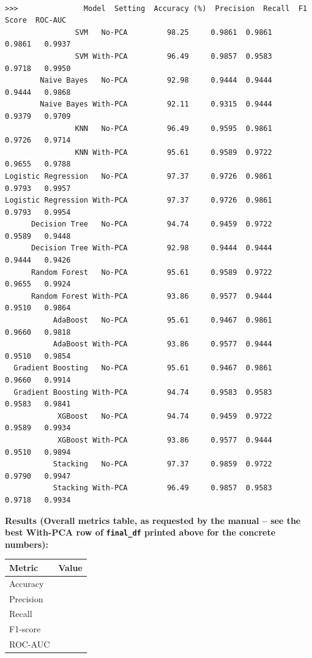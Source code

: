 \documentclass[12pt,a4paper]{article}
\begin{document}
\begin{verbatim}

>>>               Model  Setting  Accuracy (%)  Precision  Recall  F1 Score  ROC-AUC
                SVM   No-PCA         98.25     0.9861  0.9861    0.9861   0.9937
                SVM With-PCA         96.49     0.9857  0.9583    0.9718   0.9950
        Naive Bayes   No-PCA         92.98     0.9444  0.9444    0.9444   0.9868
        Naive Bayes With-PCA         92.11     0.9315  0.9444    0.9379   0.9709
                KNN   No-PCA         96.49     0.9595  0.9861    0.9726   0.9714
                KNN With-PCA         95.61     0.9589  0.9722    0.9655   0.9788
Logistic Regression   No-PCA         97.37     0.9726  0.9861    0.9793   0.9957
Logistic Regression With-PCA         97.37     0.9726  0.9861    0.9793   0.9954
      Decision Tree   No-PCA         94.74     0.9459  0.9722    0.9589   0.9448
      Decision Tree With-PCA         92.98     0.9444  0.9444    0.9444   0.9426
      Random Forest   No-PCA         95.61     0.9589  0.9722    0.9655   0.9924
      Random Forest With-PCA         93.86     0.9577  0.9444    0.9510   0.9864
           AdaBoost   No-PCA         95.61     0.9467  0.9861    0.9660   0.9818
           AdaBoost With-PCA         93.86     0.9577  0.9444    0.9510   0.9854
  Gradient Boosting   No-PCA         95.61     0.9467  0.9861    0.9660   0.9914
  Gradient Boosting With-PCA         94.74     0.9583  0.9583    0.9583   0.9841
            XGBoost   No-PCA         94.74     0.9459  0.9722    0.9589   0.9934
            XGBoost With-PCA         93.86     0.9577  0.9444    0.9510   0.9894
           Stacking   No-PCA         97.37     0.9859  0.9722    0.9790   0.9947
           Stacking With-PCA         96.49     0.9857  0.9583    0.9718   0.9934
\end{verbatim}

\textbf{Results (Overall metrics table, as requested by the manual -- see the best With-PCA row of}
\textbf{\texttt{final\_df} printed above for the concrete numbers):}

\begin{center}
\begin{tabular}{ll}
\hline
Metric & Value\\[0pt]
\hline
Accuracy & \\[0pt]
Precision & \\[0pt]
Recall & \\[0pt]
F1-score & \\[0pt]
ROC-AUC & \\[0pt]
\hline
\end{tabular}
\end{center}
\end{document}
